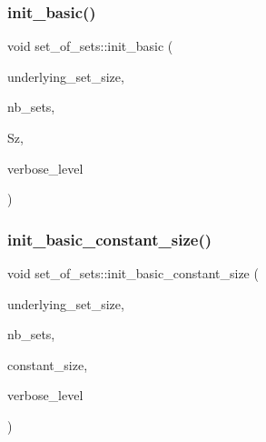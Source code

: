 \subsubsection{\texorpdfstring{init\+\_\+basic()}{init\_basic()}}
{\footnotesize\ttfamily void set\+\_\+of\+\_\+sets\+::init\+\_\+basic (\begin{DoxyParamCaption}\item[{\mbox{\hyperlink{galois_8h_a09fddde158a3a20bd2dcadb609de11dc}{I\+NT}}}]{underlying\+\_\+set\+\_\+size,  }\item[{\mbox{\hyperlink{galois_8h_a09fddde158a3a20bd2dcadb609de11dc}{I\+NT}}}]{nb\+\_\+sets,  }\item[{\mbox{\hyperlink{galois_8h_a09fddde158a3a20bd2dcadb609de11dc}{I\+NT}} $\ast$}]{Sz,  }\item[{\mbox{\hyperlink{galois_8h_a09fddde158a3a20bd2dcadb609de11dc}{I\+NT}}}]{verbose\+\_\+level }\end{DoxyParamCaption})}

\mbox{\label{classset__of__sets_a3d2bcfc5db1101cef8d5d436cca51182}} 
\subsubsection{\texorpdfstring{init\+\_\+basic\+\_\+constant\+\_\+size()}{init\_basic\_constant\_size()}}
{\footnotesize\ttfamily void set\+\_\+of\+\_\+sets\+::init\+\_\+basic\+\_\+constant\+\_\+size (\begin{DoxyParamCaption}\item[{\mbox{\hyperlink{galois_8h_a09fddde158a3a20bd2dcadb609de11dc}{I\+NT}}}]{underlying\+\_\+set\+\_\+size,  }\item[{\mbox{\hyperlink{galois_8h_a09fddde158a3a20bd2dcadb609de11dc}{I\+NT}}}]{nb\+\_\+sets,  }\item[{\mbox{\hyperlink{galois_8h_a09fddde158a3a20bd2dcadb609de11dc}{I\+NT}}}]{constant\+\_\+size,  }\item[{\mbox{\hyperlink{galois_8h_a09fddde158a3a20bd2dcadb609de11dc}{I\+NT}}}]{verbose\+\_\+level }\end{DoxyParamCaption})}

\mbox{\label{classset__of__sets_aca5e0830e593269e3ee301a8a5344f15}} 
